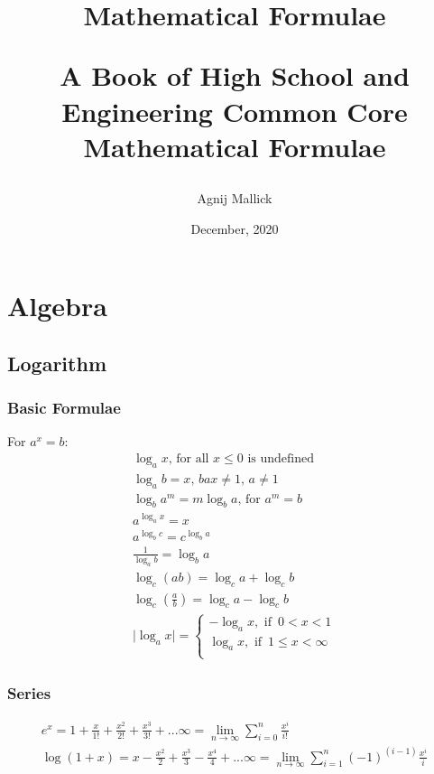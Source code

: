 \documentclass[openany, oneside]{book}
\title{Mathematical Formulae\\\begin{large}
A Book of High School and Engineering Common Core Mathematical Formulae
\end{large}}
\date{December, 2020}
\author{Agnij Mallick}
\begin{document}

\maketitle
{}
\tableofcontents
\newpage

\part{Algebra}
\large{\chapter{Logarithm}}
\section{Basic Formulae}
For $a^x=b$:
\begin{align}
\log_a x\text{, for all }x\leq0\text{ is undefined}\\
\log_a b=x\text{, }bax\neq1\text{, }a\neq1\\
\log_b a^m=m\log_b a\text{, for } a^m=b\\
a^{\log_a x}=x\\
a^{\log_b c}=c^{\log_b a}\\
\frac{1}{\log_a b}=\log_b a\\
\log_c (ab)=\log_c a+\log_c b\\
\log_c (\frac{a}{b})=\log_c a-\log_c b\\
\lvert \log_a x \rvert=\begin{cases}
-\log_a x, \text{ if } \, 0 < x < 1\\
\log_a x, \text{ if } \, 1\leq x < \infty \\
\end{cases}
\end{align}

\section{Series}
\begin{align}
e^x=1+\frac{x}{1!}+\frac{x^2}{2!}+\frac{x^3}{3!}+...\infty=\lim_{n\to\infty}\sum_{i=0}^{n}\frac{x^i}{i!}\\
\log(1+x)=x-\frac{x^2}{2}+\frac{x^3}{3}-\frac{x^4}{4}+...\infty=\lim_{n\to\infty}\sum_{i=1}^{n}(-1)^{(i-1)}\frac{x^i}{i}
\end{align}
\end{document}

